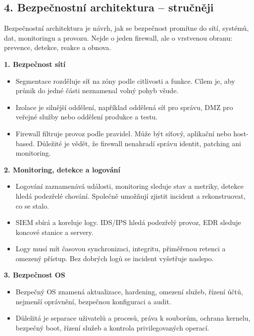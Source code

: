 
\subsection*{4. Bezpečnostní architektura -- stručněji}
Bezpečnostní architektura je návrh, jak se bezpečnost promítne do sítí, systémů, dat, monitoringu a provozu. Nejde o jeden firewall, ale o vrstvenou obranu: prevence, detekce, reakce a obnova.

\textbf{1. Bezpečnost sítí}
\begin{itemize}
  \item Segmentace rozděluje síť na zóny podle citlivosti a funkce. Cílem je, aby průnik do jedné části neznamenal volný pohyb všude.
  \item Izolace je silnější oddělení, například oddělená síť pro správu, DMZ pro veřejné služby nebo oddělení produkce a testu.
  \item Firewall filtruje provoz podle pravidel. Může být síťový, aplikační nebo host-based. Důležité je vědět, že firewall nenahradí správu identit, patching ani monitoring.
\end{itemize}

\textbf{2. Monitoring, detekce a logování}
\begin{itemize}
  \item Logování zaznamenává události, monitoring sleduje stav a metriky, detekce hledá podezřelé chování. Společně umožňují zjistit incident a rekonstruovat, co se stalo.
  \item SIEM sbírá a koreluje logy. IDS/IPS hledá podezřelý provoz, EDR sleduje koncové stanice a servery.
  \item Logy musí mít časovou synchronizaci, integritu, přiměřenou retenci a omezený přístup. Bez dobrých logů se incident vyšetřuje naslepo.
\end{itemize}

\textbf{3. Bezpečnost OS}
\begin{itemize}
  \item Bezpečný OS znamená aktualizace, hardening, omezení služeb, řízení účtů, nejmenší oprávnění, bezpečnou konfiguraci a audit.
  \item Důležitá je separace uživatelů a procesů, práva k souborům, ochrana kernelu, bezpečný boot, řízení služeb a kontrola privilegovaných operací.
\end{itemize}

